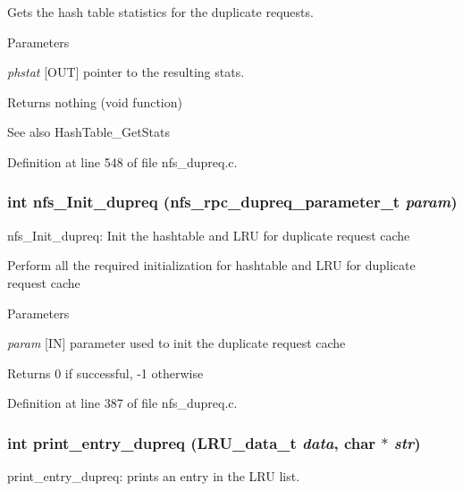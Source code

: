 Gets the hash table statistics for the duplicate requests.


\begin{DoxyParams}{Parameters}
\item[{\em phstat}][OUT] pointer to the resulting stats.\end{DoxyParams}
\begin{DoxyReturn}{Returns}
nothing (void function)
\end{DoxyReturn}
\begin{DoxySeeAlso}{See also}
HashTable\_\-GetStats 
\end{DoxySeeAlso}


Definition at line 548 of file nfs\_\-dupreq.c.
\subsubsection[{nfs\_\-Init\_\-dupreq}]{\setlength{\rightskip}{0pt plus 5cm}int nfs\_\-Init\_\-dupreq (nfs\_\-rpc\_\-dupreq\_\-parameter\_\-t {\em param})}\label{nfs__dupreq_8c_a0e0c7a1fda2f7d756dd1b2f8b4f97db6}
nfs\_\-Init\_\-dupreq: Init the hashtable and LRU for duplicate request cache

Perform all the required initialization for hashtable and LRU for duplicate request cache


\begin{DoxyParams}{Parameters}
\item[{\em param}][IN] parameter used to init the duplicate request cache\end{DoxyParams}
\begin{DoxyReturn}{Returns}
0 if successful, -\/1 otherwise 
\end{DoxyReturn}


Definition at line 387 of file nfs\_\-dupreq.c.
\subsubsection[{print\_\-entry\_\-dupreq}]{\setlength{\rightskip}{0pt plus 5cm}int print\_\-entry\_\-dupreq (LRU\_\-data\_\-t {\em data}, \/  char $\ast$ {\em str})}\label{nfs__dupreq_8c_af812dda060fd0aa4f965adadb15dd22d}
print\_\-entry\_\-dupreq: prints an entry in the LRU list.

